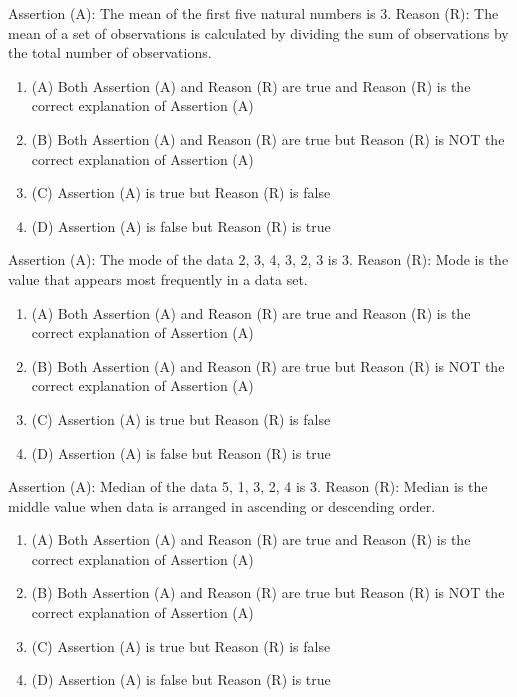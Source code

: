 \documentclass[12pt,a4paper]{exam}
\begin{document}
\begin{questions}
\question[1] Assertion (A): The mean of the first five natural numbers is 3. Reason (R): The mean of a set of observations is calculated by dividing the sum of observations by the total number of observations.
\begin{enumerate}[label=(\Alph*)]
  \item (A) Both Assertion (A) and Reason (R) are true and Reason (R) is the correct explanation of Assertion (A)
  \item (B) Both Assertion (A) and Reason (R) are true but Reason (R) is NOT the correct explanation of Assertion (A)
  \item (C) Assertion (A) is true but Reason (R) is false
  \item (D) Assertion (A) is false but Reason (R) is true
\end{enumerate}
\vspace{0.15cm}

\question[1] Assertion (A): The mode of the data 2, 3, 4, 3, 2, 3 is 3. Reason (R): Mode is the value that appears most frequently in a data set.
\begin{enumerate}[label=(\Alph*)]
  \item (A) Both Assertion (A) and Reason (R) are true and Reason (R) is the correct explanation of Assertion (A)
  \item (B) Both Assertion (A) and Reason (R) are true but Reason (R) is NOT the correct explanation of Assertion (A)
  \item (C) Assertion (A) is true but Reason (R) is false
  \item (D) Assertion (A) is false but Reason (R) is true
\end{enumerate}
\vspace{0.15cm}

\question[1] Assertion (A): Median of the data 5, 1, 3, 2, 4 is 3. Reason (R): Median is the middle value when data is arranged in ascending or descending order.
\begin{enumerate}[label=(\Alph*)]
  \item (A) Both Assertion (A) and Reason (R) are true and Reason (R) is the correct explanation of Assertion (A)
  \item (B) Both Assertion (A) and Reason (R) are true but Reason (R) is NOT the correct explanation of Assertion (A)
  \item (C) Assertion (A) is true but Reason (R) is false
  \item (D) Assertion (A) is false but Reason (R) is true
\end{enumerate}
\vspace{0.15cm}


\end{questions}
\end{document}
